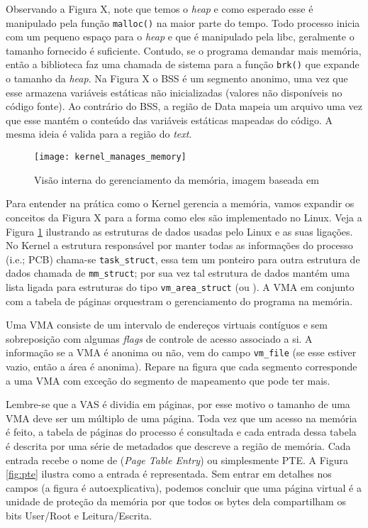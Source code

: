 Observando a Figura X, note que temos o \textit{heap} e como esperado esse é
manipulado pela função \texttt{malloc()} na maior parte do tempo. Todo processo
inicia com um pequeno espaço para o \textit{heap} e que é manipulado pela libc,
geralmente o tamanho fornecido é suficiente. Contudo, se o programa demandar
mais memória, então a biblioteca faz uma chamada de sistema para a função
\texttt{brk()} que expande o tamanho da \textit{heap}. Na Figura X o BSS é um
segmento anonimo, uma vez que esse armazena variáveis estáticas não
inicializadas (valores não disponíveis no código fonte). Ao contrário do BSS, a
região de Data mapeia um arquivo uma vez que esse mantém o conteúdo das
variáveis estáticas mapeadas do código. A mesma ideia é valida para a região do
\textit{text}.

\begin{figure}[!h]
  \centering
  \texttt{[image: kernel\_manages\_memory]}
  \caption{Visão interna do gerenciamento da memória, imagem baseada em \citep{kernel_manages_memory}}
  \label{fig:kernel_manages_memory}
\end{figure}

Para entender na prática como o Kernel gerencia a memória, vamos expandir os
conceitos da Figura X para a forma como eles são implementado no Linux. Veja a
Figura \ref{fig:kernel_manages_memory} ilustrando as estruturas de dados usadas
pelo Linux e as suas ligações. No Kernel a estrutura responsável por manter
todas as informações do processo (i.e.; PCB) chama-se \texttt{task\_struct},
essa tem um ponteiro para outra estrutura de dados chamada de
\texttt{mm\_struct}; por sua vez tal estrutura de dados mantém uma lista ligada
para estruturas do tipo \texttt{vm\_area\_struct} (ou ). A VMA em conjunto com a tabela de páginas orquestram o
gerenciamento do programa na memória.

Uma VMA consiste de um intervalo de endereços virtuais contíguos e sem
sobreposição com algumas \textit{flags} de controle de acesso associado a si. A
informação se a VMA é anonima ou não, vem do campo \texttt{vm\_file} (se esse
estiver vazio, então a área é anonima). Repare na figura que cada segmento
corresponde a uma VMA com exceção do segmento de mapeamento que pode ter mais.

Lembre-se que a VAS é dividia em páginas, por esse motivo o tamanho de uma VMA
deve ser um múltiplo de uma página. Toda vez que um acesso na memória é feito,
a tabela de páginas do processo é consultada e cada entrada dessa tabela é
descrita por uma série de metadados que descreve a região de memória. Cada
entrada recebe o nome de  (\textit{Page
Table Entry}) ou simplesmente PTE. A Figura \ref{fig:pte} ilustra como a
entrada é representada. Sem entrar em detalhes nos campos (a figura é
autoexplicativa), podemos concluir que uma página virtual é a unidade de
proteção da memória por que todos os bytes dela compartilham os bits User/Root
e Leitura/Escrita.

